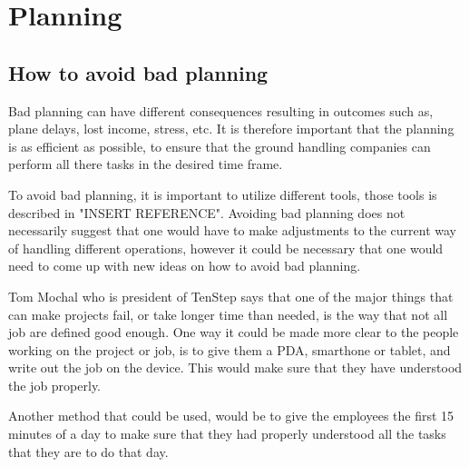 \chapter{Planning}
\section{How to avoid bad planning}

Bad planning can have different consequences resulting in outcomes such as, plane delays, lost income, stress, etc. It is therefore important that the planning is as efficient as possible, to ensure that the ground handling companies can perform all there tasks in the desired time frame.

To avoid bad planning, it is important to utilize different tools, those  tools is described in "INSERT REFERENCE". Avoiding bad planning does not necessarily suggest that one would have to make adjustments to the current way of handling different operations, however it could be necessary that one would need to come up with new ideas on how to avoid bad planning.

Tom Mochal who is president of TenStep \cite{AvoidP_TenStep} says that one of the major things that can make projects fail, or take longer time than needed, is the way that not all job are defined good enough\cite{AvoidP_PoorP}. One way it could be made more clear to the people working on the project or job, is to give them a PDA, smarthone or tablet, and write out the job on the device. This would make sure that they have understood the job properly.

Another method that could be used, would be to give the employees the first 15 minutes of a day to make sure that they had properly understood all the tasks that they are to do that day.
